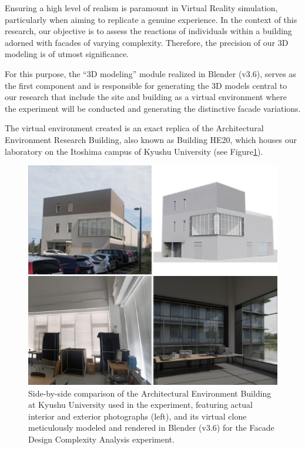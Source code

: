 %    

Ensuring a high level of realism is paramount in Virtual Reality simulation, particularly when aiming to replicate a genuine experience.
In the context of this research, our objective is to assess the reactions of individuals within a building adorned with facades of varying complexity.
Therefore, the precision of our 3D modeling is of utmost significance.

For this purpose, the ``3D modeling'' module realized in Blender (v3.6), serves as the first component and is responsible for generating the 3D models central to our research that include the site and building as a virtual environment where the experiment will be conducted and generating the distinctive facade variations.

The virtual environment created is an exact replica of the Architectural Environment Research Building, also known as Building HE20, which houses our laboratory on the Itoshima campus of Kyushu University (see Figure\ref{fig:RealVs3dModel}).

     \begin{figure}[htb]
          \centering
          \includegraphics[width= \linewidth]{Images/Realvs3DmodelBlender}
          \caption{Side-by-side comparison of the Architectural Environment Building at Kyushu University used in the experiment, featuring actual interior and exterior photographs (left), and its virtual clone meticulously modeled and rendered in Blender (v3.6) for the Facade Design Complexity Analysis experiment.}
          \label{fig:RealVs3dModel}
        \end{figure}

